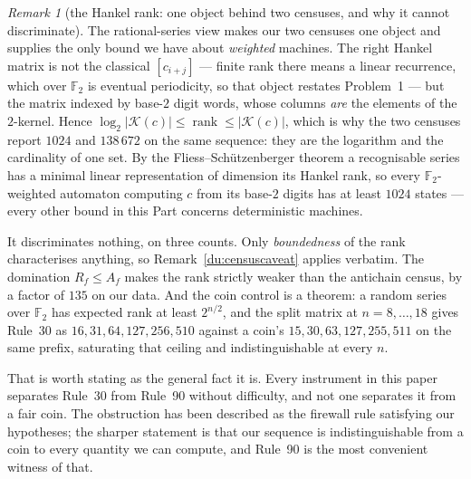 \documentclass[11pt]{article}
\theoremstyle{definition}
\theoremstyle{remark}
\newtheorem{remark}[theorem]{Remark}
\newcommand{\F}{\mathbb{F}_2}
\begin{document}
\begin{remark}[the Hankel rank: one object behind two censuses, and why it cannot discriminate]\label{du:hankel}
The rational-series view makes our two censuses one object and supplies the only bound we have about
\emph{weighted} machines. The right Hankel matrix is not the classical $[c_{i+j}]$ --- finite rank there
means a linear recurrence, which over $\F$ is eventual periodicity, so that object restates Problem~1
--- but the matrix indexed by base-$2$ digit words, whose columns \emph{are} the elements of the
$2$-kernel. Hence $\log_2|\mathcal K(c)|\le\operatorname{rank}\le|\mathcal K(c)|$, which is why the two
censuses report $1024$ and $138\,672$ on the same sequence: they are the logarithm and the cardinality
of one set. By the Fliess--Sch\"utzenberger theorem a recognisable series has a minimal linear
representation of dimension its Hankel rank, so every $\F$-weighted automaton computing $c$ from its
base-$2$ digits has at least $1024$ states --- every other bound in this Part concerns deterministic
machines.

It discriminates nothing, on three counts. Only \emph{boundedness} of the rank characterises anything,
so Remark~\ref{du:censuscaveat} applies verbatim. The domination $R_f\le A_f$ makes the rank strictly
weaker than the antichain census, by a factor of $135$ on our data. And the coin control is a theorem:
a random series over $\F$ has expected rank at least $2^{n/2}$, and the split matrix at $n=8,\dots,18$
gives Rule~30 as $16,31,64,127,256,510$ against a coin's $15,30,63,127,255,511$ on the same prefix,
saturating that ceiling and indistinguishable at every $n$.

That is worth stating as the general fact it is. Every instrument in this paper separates Rule~30 from
Rule~90 without difficulty, and not one separates it from a fair coin. The obstruction has been
described as the firewall rule satisfying our hypotheses; the sharper statement is that our sequence is
indistinguishable from a coin to every quantity we can compute, and Rule~90 is the most convenient
witness of that.
\end{remark}
\end{document}

